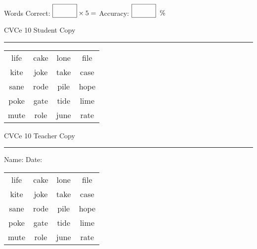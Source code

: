 \documentclass{memoir}
\begin{document}
\small

Words Correct: $\fbox{\phantom{\huge 100}} \times 5 = $ Accuracy: $\fbox{\phantom{\huge 100}}\;\; \%$ 

\vfill

\newpage


\footnotesize \noindent
CVCe 10 \hfill Student Copy
\smallskip
\hrule

\Large

\setlength{\tabcolsep}{14pt}
\def\arraystretch{2}

{\selectfont


\begin{vplace}[0.5]
\begin{center}
\begin{tabular}{cccc}
life & cake & lone & file \\
kite & joke & take & case \\
sane & rode & pile & hope \\
poke & gate & tide & lime \\
mute & role & june & rate \\
\end{tabular}
\end{center}
\end{vplace}

}

\newpage

\footnotesize \noindent
CVCe 10 \hfill Teacher Copy
\smallskip
\hrule

\small

\vfill

\noindent
Name: \underline{\hspace{1.75in}} \hfill Date: \underline{\hspace{1in}}

\Large

{\selectfont


\begin{vplace}[0.5]
\begin{center}
\begin{tabular}{cccc}
life & cake & lone & file \\
kite & joke & take & case \\
sane & rode & pile & hope \\
poke & gate & tide & lime \\
mute & role & june & rate \\
\end{tabular}
\end{center}
\end{vplace}



}
\end{document}
